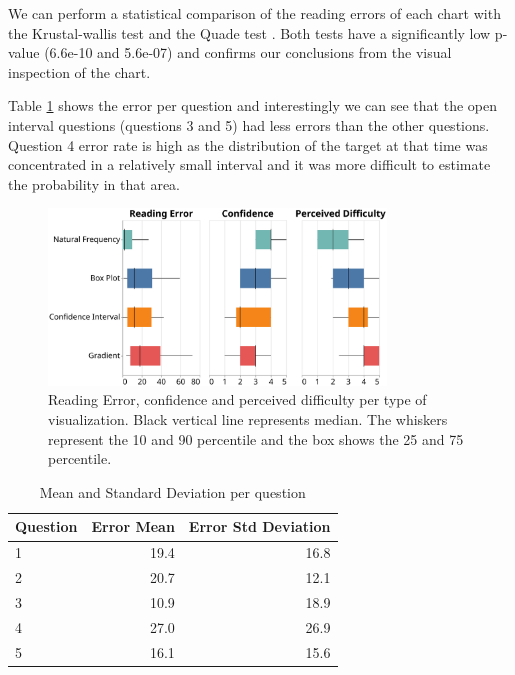 \documentclass[a4paper,3p,sort&compress]{elsarticle}
\begin{document}
We can perform a statistical comparison of the reading errors of each chart with the Krustal-wallis test \cite{krustal} and 
the Quade test \cite{quade_rank_1967}. Both tests have a 
significantly low p-value (6.6e-10 and 5.6e-07) and confirms our conclusions from the visual inspection of the chart.

Table \ref{table:resultsperquestion} shows the error per question and interestingly we can see that the open interval questions (questions 3 and 5) 
had less errors than the other questions. Question 4 error rate is high as the distribution of the target at that time was concentrated in a relatively 
small interval and it was more difficult to estimate the probability in that area. 

\begin{figure}
  \centering
  \includegraphics[width=0.8\textwidth]{comparison}
  \caption{\label{figure:errors}Reading Error, confidence and perceived difficulty per 
  type of visualization. Black vertical line represents median.
  The whiskers represent the 10 and 90 percentile and the box shows the 25 and 
  75 percentile.}
\end{figure}


\begin{table}[h!]
  \centering
  \begin{tabular}{lrr}
    \toprule
    {}Question &     Error Mean &        Error Std Deviation \\
    \midrule
    1 &  19.4 &  16.8 \\
    2 &  20.7 &  12.1 \\
    3 &  10.9 &  18.9 \\
    4 &  27.0 &  26.9 \\
    5 &  16.1 &  15.6 \\
    \bottomrule
    \end{tabular}
  \caption{Mean and Standard Deviation per question}
  \label{table:resultsperquestion}
  \end{table}
\end{document}
